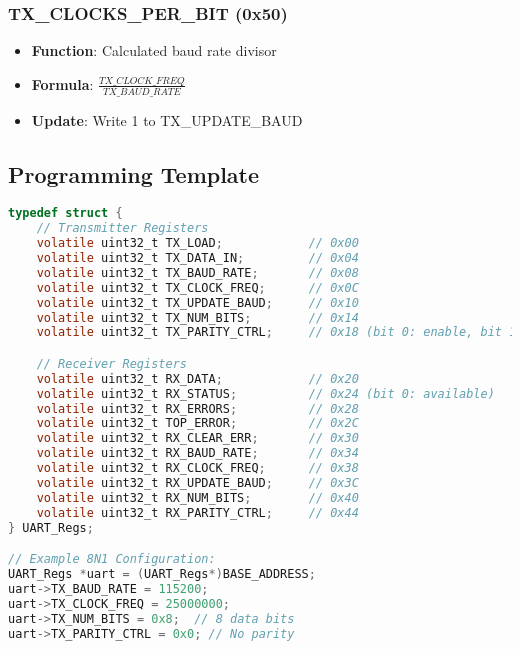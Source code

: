 \subsubsection{TX\_CLOCKS\_PER\_BIT (0x50)}
\begin{itemize}
\item \textbf{Function}: Calculated baud rate divisor
\item \textbf{Formula}: $\frac{TX\_CLOCK\_FREQ}{TX\_BAUD\_RATE}$
\item \textbf{Update}: Write 1 to TX\_UPDATE\_BAUD
\end{itemize}

\subsection{Programming Template}
\begin{lstlisting}[language=C,frame=single]
typedef struct {
    // Transmitter Registers
    volatile uint32_t TX_LOAD;            // 0x00
    volatile uint32_t TX_DATA_IN;         // 0x04
    volatile uint32_t TX_BAUD_RATE;       // 0x08
    volatile uint32_t TX_CLOCK_FREQ;      // 0x0C
    volatile uint32_t TX_UPDATE_BAUD;     // 0x10
    volatile uint32_t TX_NUM_BITS;        // 0x14
    volatile uint32_t TX_PARITY_CTRL;     // 0x18 (bit 0: enable, bit 1: odd)

    // Receiver Registers
    volatile uint32_t RX_DATA;            // 0x20
    volatile uint32_t RX_STATUS;          // 0x24 (bit 0: available)
    volatile uint32_t RX_ERRORS;          // 0x28
    volatile uint32_t TOP_ERROR;          // 0x2C
    volatile uint32_t RX_CLEAR_ERR;       // 0x30
    volatile uint32_t RX_BAUD_RATE;       // 0x34
    volatile uint32_t RX_CLOCK_FREQ;      // 0x38
    volatile uint32_t RX_UPDATE_BAUD;     // 0x3C
    volatile uint32_t RX_NUM_BITS;        // 0x40
    volatile uint32_t RX_PARITY_CTRL;     // 0x44
} UART_Regs;

// Example 8N1 Configuration:
UART_Regs *uart = (UART_Regs*)BASE_ADDRESS;
uart->TX_BAUD_RATE = 115200;
uart->TX_CLOCK_FREQ = 25000000;
uart->TX_NUM_BITS = 0x8;  // 8 data bits
uart->TX_PARITY_CTRL = 0x0; // No parity
\end{lstlisting}

